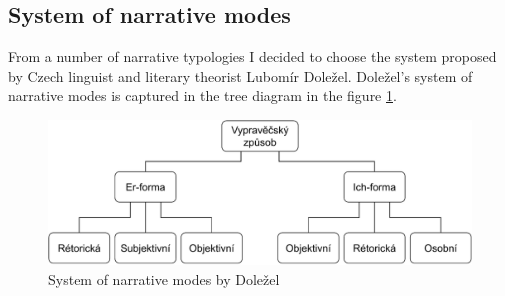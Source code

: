 \subsection{System of narrative modes}

From a number of narrative typologies I decided to choose the system proposed by Czech linguist and literary theorist Lubomír Doležel. Doležel's system of narrative modes is captured in the tree diagram in the figure \ref{fig:schema-dolezel}.\cite{dolezel-narativni-zpusoby}

\begin{figure}[ht]
\includegraphics[width=1\textwidth]{data/dolezel-schema.pdf}
\caption{System of narrative modes by Doležel}
\label{fig:schema-dolezel}
\end{figure}



